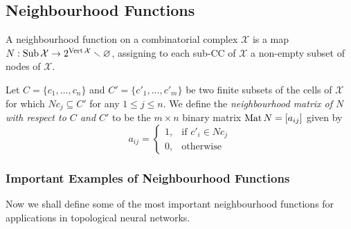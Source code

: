 \subsection{Neighbourhood Functions}

\begin{definition}
    \label{def:neighbourhood-function}
    A neighbourhood function on a combinatorial complex \(\mathcal{X}\) is a map
    \(N: \operatorname{Sub} \mathcal{X} \to 2^{\operatorname{Vert} \mathcal{X}} \smallsetminus \varnothing\), assigning to each sub-CC of \(\mathcal{X}\) a non-empty
    subset of nodes of \(\mathcal{X}\).

    Let \(C = \{c_1, \dots, c_n\}\) and \(C' = \{c'_1, \dots, c'_m\}\) be two finite
    subsets of the cells of \(\mathcal{X}\) for which \(N c_j \subseteq C'\) for any \(1 \leq j \leq n\). We
    define the \emph{neighbourhood matrix of \(N\) with respect to \(C\) and \(C'\)}
    to be the \(m \times n\) binary matrix \(\operatorname{Mat} N = [a_{i j}]\) given by
    \[
        a_{i j} =
        \begin{cases}
            1, & \text{if } c'_i \in N c_j \\
            0, & \text{otherwise}
        \end{cases}
    \]
\end{definition}

\subsubsection{Important Examples of Neighbourhood Functions}

Now we shall define some of the most important neighbourhood functions for
applications in topological neural networks.

